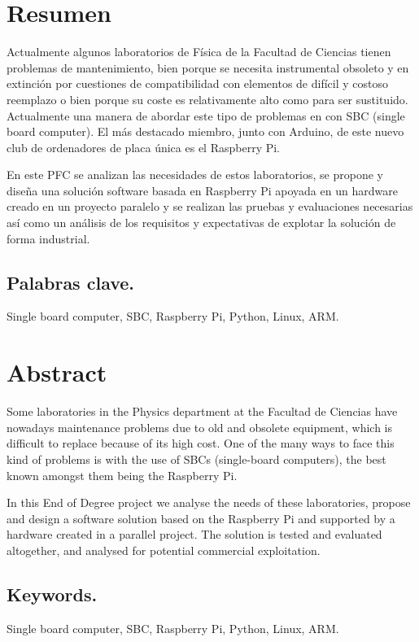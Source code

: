 \chapter*{Resumen}
Actualmente algunos laboratorios de Física de la Facultad de Ciencias tienen problemas de mantenimiento, bien porque se necesita instrumental obsoleto y en extinción por cuestiones de compatibilidad con elementos de difícil y costoso reemplazo o bien porque su coste es relativamente alto como para ser sustituido. Actualmente una manera de abordar este tipo de problemas en con SBC (single board computer). El más destacado miembro, junto con Arduino, de este nuevo club de ordenadores de placa única es el Raspberry Pi.

En este PFC se analizan las necesidades de estos laboratorios, se propone y diseña una solución software basada en Raspberry Pi apoyada en un hardware creado en un proyecto paralelo y se realizan las pruebas y evaluaciones necesarias así como un análisis de los requisitos y expectativas de explotar la solución de forma industrial.

\section*{Palabras clave.}
Single board computer, SBC, Raspberry Pi, Python, Linux, ARM.

\chapter*{Abstract}

Some laboratories in the Physics department at the Facultad de Ciencias have nowadays maintenance problems 
due to old and obsolete equipment, which is difficult to replace because of its high cost. One of the many ways to 
face this kind of problems is with the use of SBCs (single-board computers), the best known amongst them being the Raspberry Pi.

In this End of Degree project we analyse the needs of these laboratories, propose and design a software solution
based on the Raspberry Pi and supported by a hardware created in a parallel project. 
The solution is tested and evaluated altogether, and analysed for potential commercial exploitation.

\section*{Keywords.}
Single board computer, SBC, Raspberry Pi, Python, Linux, ARM.